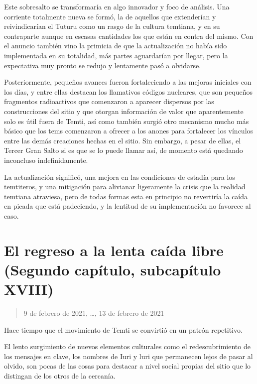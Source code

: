 \documentclass[
  spanish,
]{book}
\begin{document}
Este sobresalto se transformaría en algo innovador y foco de análisis. Una corriente totalmente nueva se formó, la de aquellos que extenderían y reivindicarían el Tuturu como un rasgo de la cultura temtiana, y en su contraparte aunque en escasas cantidades los que están en contra del mismo. Con el anuncio también vino la primicia de que la actualización no había sido implementada en su totalidad, más partes aguardarían por llegar, pero la expectativa muy pronto se redujo y lentamente pasó a olvidarse.

Posteriormente, pequeños avances fueron fortaleciendo a las mejoras iniciales con los días, y entre ellas destacan los llamativos códigos nucleares, que son pequeños fragmentos radioactivos que comenzaron a aparecer dispersos por las construcciones del sitio y que otorgan información de valor que aparentemente solo es útil fuera de Temti, así como también surgió otro mecanismo mucho más básico que los tems comenzaron a ofrecer a los anones para fortalecer los vínculos entre las demás creaciones hechas en el sitio. Sin embargo, a pesar de ellas, el Tercer Gran Salto si es que se lo puede llamar así, de momento está quedando inconcluso indefinidamente.

La actualización significó, una mejora en las condiciones de estadía para los temtiteros, y una mitigación para alivianar ligeramente la crisis que la realidad temtiana atraviesa, pero de todas formas esta en principio no revertiría la caída en picada que está padeciendo, y la lentitud de su implementación no favorece al caso.

\hypertarget{el-regreso-a-la-lenta-cauxedda-libre-segundo-capuxedtulo-subcapuxedtulo-xviii}{%
\section{El regreso a la lenta caída libre (Segundo capítulo, subcapítulo XVIII)}\label{el-regreso-a-la-lenta-cauxedda-libre-segundo-capuxedtulo-subcapuxedtulo-xviii}}

\begin{quote}
9 de febrero de 2021, \ldots, 13 de febrero de 2021
\end{quote}

Hace tiempo que el movimiento de Temti se convirtió en un patrón repetitivo.

El lento surgimiento de nuevos elementos culturales como el redescubrimiento de los mensajes en clave, los nombres de Iuri y luri que permanecen lejos de pasar al olvido, son pocas de las cosas para destacar a nivel social propias del sitio que lo distingan de los otros de la cercanía.
\end{document}
